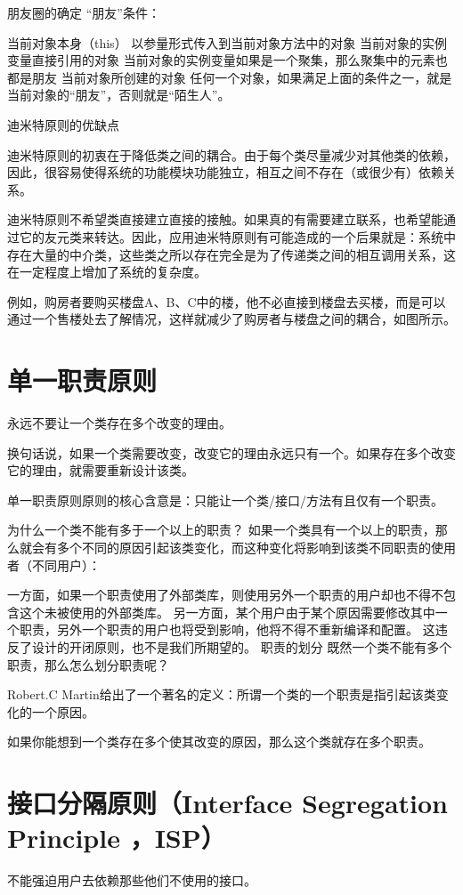 朋友圈的确定
“朋友”条件：

当前对象本身（this）
以参量形式传入到当前对象方法中的对象
当前对象的实例变量直接引用的对象
当前对象的实例变量如果是一个聚集，那么聚集中的元素也都是朋友
当前对象所创建的对象
任何一个对象，如果满足上面的条件之一，就是当前对象的“朋友”，否则就是“陌生人”。

迪米特原则的优缺点

迪米特原则的初衷在于降低类之间的耦合。由于每个类尽量减少对其他类的依赖，因此，很容易使得系统的功能模块功能独立，相互之间不存在（或很少有）依赖关系。

迪米特原则不希望类直接建立直接的接触。如果真的有需要建立联系，也希望能通过它的友元类来转达。因此，应用迪米特原则有可能造成的一个后果就是：系统中存在大量的中介类，这些类之所以存在完全是为了传递类之间的相互调用关系，这在一定程度上增加了系统的复杂度。

例如，购房者要购买楼盘A、B、C中的楼，他不必直接到楼盘去买楼，而是可以通过一个售楼处去了解情况，这样就减少了购房者与楼盘之间的耦合，如图所示。

\section{单一职责原则}
永远不要让一个类存在多个改变的理由。

换句话说，如果一个类需要改变，改变它的理由永远只有一个。如果存在多个改变它的理由，就需要重新设计该类。

单一职责原则原则的核心含意是：只能让一个类/接口/方法有且仅有一个职责。

为什么一个类不能有多于一个以上的职责？
如果一个类具有一个以上的职责，那么就会有多个不同的原因引起该类变化，而这种变化将影响到该类不同职责的使用者（不同用户）：

一方面，如果一个职责使用了外部类库，则使用另外一个职责的用户却也不得不包含这个未被使用的外部类库。
另一方面，某个用户由于某个原因需要修改其中一个职责，另外一个职责的用户也将受到影响，他将不得不重新编译和配置。
这违反了设计的开闭原则，也不是我们所期望的。
职责的划分
既然一个类不能有多个职责，那么怎么划分职责呢？

Robert.C Martin给出了一个著名的定义：所谓一个类的一个职责是指引起该类变化的一个原因。

如果你能想到一个类存在多个使其改变的原因，那么这个类就存在多个职责。

\section{接口分隔原则（Interface Segregation Principle ，ISP）}
不能强迫用户去依赖那些他们不使用的接口。

